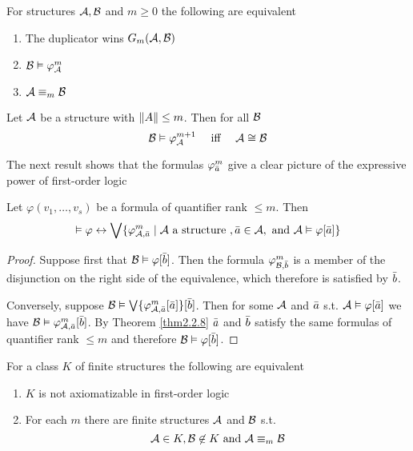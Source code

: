 \documentclass[11pt]{article}
\begin{document}
\begin{corollary}[]
For structures \(\mathcal{A},\mathcal{B}\) and \(m\ge0\) the following are equivalent
\begin{enumerate}
\item The duplicator wins \(G_m(\mathcal{A},\mathcal{B})\)
\item \(\mathcal{B}\vDash\varphi_{\mathcal{A}}^m\)
\item \(\mathcal{A}\equiv_m\mathcal{B}\)
\end{enumerate}
\end{corollary}

\begin{corollary}[]
Let \(\mathcal{A}\) be a structure with \(\left\lVert A\right\rVert\le m\). Then for all \(\mathcal{B}\)
\begin{equation*}
\mathcal{B}\vDash\varphi_{\mathcal{A}}^{m+1}
\quad\text{ iff }\quad
\mathcal{A}\cong\mathcal{B}
\end{equation*}
\end{corollary}

The next result shows that the formulas \(\varphi_{\bar{a}}^m\) give a clear picture of the
expressive power of first-order logic

\begin{theorem}[]
Let \(\varphi(v_1,\dots,v_s)\) be a formula of quantifier rank \(\le m\). Then
\begin{equation*}
\vDash\varphi\leftrightarrow
\bigvee
\{\varphi_{\mathcal{A},\bar{a}}^m\mid\mathcal{A}\text{ a structure },
\bar{a}\in\mathcal{A},\text{ and }\mathcal{A}\vDash\varphi[\bar{a}]\}
\end{equation*}
\end{theorem}

\begin{proof}
Suppose first that \(\mathcal{B}\vDash\varphi[\bar{b}]\). Then the formula \(\varphi_{\mathcal{B},\bar{b}}^m\) is
a member of the disjunction on the right side of the equivalence, which therefore is satisfied
by \(\bar{b}\).

Conversely, suppose \(\mathcal{B}\vDash\bigvee\{\varphi_{\mathcal{A},\bar{a}}^m[\bar{a}]\}[\bar{b}]\). Then for
some \(\mathcal{A}\) and \(\bar{a}\) s.t. \(\mathcal{A}\vDash\varphi[\bar{a}]\) we
have \(\mathcal{B}\vDash\varphi_{\mathcal{A},\bar{a}}^m[\bar{b}]\). By Theorem \ref{thm2.2.8} \(\bar{a}\)
and \(\bar{b}\) satisfy the same formulas of quantifier rank \(\le m\) and therefore \(\mathcal{B}\vDash\varphi[\bar{b}]\).
\end{proof}

\begin{theorem}[]
For a class \(K\) of finite structures the following are equivalent
\begin{enumerate}
\item \(K\) is not axiomatizable in first-order logic
\item For each \(m\) there are finite structures \(\mathcal{A}\) and \(\mathcal{B}\) s.t.
\begin{equation*}
\mathcal{A}\in K,\mathcal{B}\not\in K\text{ and }\mathcal{A}\equiv_m\mathcal{B}
\end{equation*}
\end{enumerate}
\end{theorem}
\end{document}
